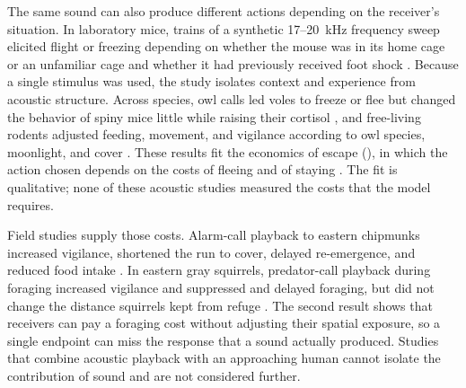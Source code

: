 The same sound can also produce different actions depending on the receiver's situation. In laboratory mice, trains of a synthetic 17--20~kHz frequency sweep elicited flight or freezing depending on whether the mouse was in its home cage or an unfamiliar cage and whether it had previously received foot shock \citep{MongeauEtAl2003}. Because a single stimulus was used, the study isolates context and experience from acoustic structure.
Across species, owl calls led voles to freeze or flee but changed the behavior of spiny mice little while raising their cortisol \citep{EilamEtAl1999}, and free-living rodents adjusted feeding, movement, and vigilance according to owl species, moonlight, and cover \citep{HernandezEtAl2021}. These results fit the economics of escape (), in which the action chosen depends on the costs of fleeing and of staying \citep{YdenbergDill1986}. The fit is qualitative; none of these acoustic studies measured the costs that the model requires.

Field studies supply those costs. Alarm-call playback to eastern chipmunks increased vigilance, shortened the run to cover, delayed re-emergence, and reduced food intake \citep{BaackSwitzer2000}. In eastern gray squirrels, predator-call playback during foraging increased vigilance and suppressed and delayed foraging, but did not change the distance squirrels kept from refuge \citep{JayneEtAl2015}.
The second result shows that receivers can pay a foraging cost without adjusting their spatial exposure, so a single endpoint can miss the response that a sound actually produced.
Studies that combine acoustic playback with an approaching human \citep{KittendorfDantzer2021} cannot isolate the contribution of sound and are not considered further.


